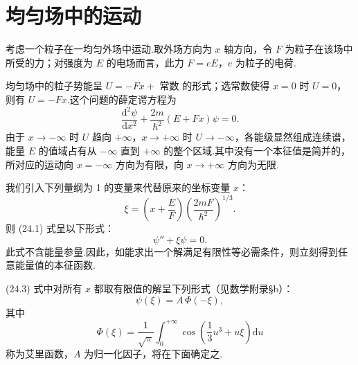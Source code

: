 \section{均匀场中的运动}

考虑一个粒子在一均匀外场中运动.取外场方向为 $x$ 轴方向，令 $F$ 为粒子在该场中所受的力；对强度为 $E$ 的电场而言，此力 $F=eE$，$e$ 为粒子的电荷.

均匀场中的粒子势能呈 $U=-Fx+$ 常数 的形式；选常数使得 $x=0$ 时 $U=0$，则有 $U=-Fx$.这个问题的薛定谔方程为
\begin{equation}
  \frac{\mathrm{d}^2\psi}{\mathrm{d}x^2}
  +\frac{2m}{\hbar^2}\left(E+Fx\right)\psi=0.
\end{equation}
由于 $x\to-\infty$ 时 $U$ 趋向 $+\infty$，$x\to+\infty$ 时 $U\to-\infty$，各能级显然组成连续谱，能量 $E$ 的值域占有从 $-\infty$ 直到 $+\infty$ 的整个区域.其中没有一个本征值是简并的，所对应的运动向 $x=-\infty$ 方向为有限，向 $x\to+\infty$ 方向为无限.

我们引入下列量纲为 1 的变量来代替原来的坐标变量 $x$：
\begin{equation}
  \xi=\left(x+\frac{E}{F}\right)
  \left(\frac{2mF}{\hbar^2}\right)^{1/3}.
\end{equation}
则 (24.1) 式呈以下形式：
\begin{equation}
  \psi''+\xi\psi=0.
\end{equation}
此式不含能量参量.因此，如能求出一个解满足有限性等必需条件，则立刻得到任意能量值的本征函数.

(24.3) 式中对所有 $x$ 都取有限值的解呈下列形式（见数学附录§b）：
\begin{equation}
  \psi(\xi)=A\,\varPhi(-\xi),
\end{equation}
其中
\begin{equation*}
  \varPhi(\xi)=\frac{1}{\sqrt{\pi}}
  \int_0^{+\infty}\cos\left(\frac{1}{3}u^3+u\xi\right)\mathrm{d}u
\end{equation*}
称为艾里函数，$A$ 为归一化因子，将在下面确定之.

